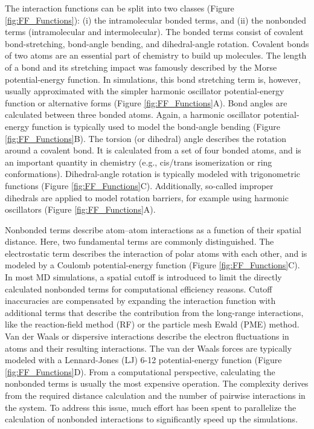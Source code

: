 The interaction functions can be split into two classes (Figure \ref{fig:FF_Functions}): (i) the intramolecular bonded terms, and (ii) the nonbonded terms (intramolecular and intermolecular).\cite{Weiner1984, Riniker2018}
The bonded terms consist of covalent bond-stretching, bond-angle bending, and dihedral-angle rotation.
Covalent bonds of two atoms are an essential part of chemistry to build up molecules. \cite{Pauling1934} The length of a bond and its stretching impact was famously described by the Morse potential-energy function. \cite{Morse1929, Iozzi2009} In simulations, this bond stretching term is, however, usually approximated with the simpler harmonic oscillator potential-energy function or alternative forms (Figure \ref{fig:FF_Functions}A).\cite{Gunsteren1996} Bond angles are calculated between three bonded atoms. \cite{Pauling1931, Slater1931}
Again, a harmonic oscillator potential-energy function is typically used to model the bond-angle bending (Figure \ref{fig:FF_Functions}B). 
The torsion (or dihedral) angle describes the rotation around a covalent bond. \cite{Blondel1996} It is calculated from a set of four bonded atoms, and is an important quantity in chemistry (e.g., cis/trans isomerization \cite{Dugave2003} or ring conformations\cite{Strauss1970}). Dihedral-angle rotation is typically modeled with trigonometric functions (Figure \ref{fig:FF_Functions}C).
Additionally, so-called improper dihedrals are applied to model rotation barriers, for example using harmonic oscillators (Figure \ref{fig:FF_Functions}A).\cite{Blondel1996}

Nonbonded terms describe atom--atom interactions as a function of their spatial distance. Here, two fundamental terms are commonly distinguished.
The electrostatic term describes the interaction of polar atoms with each other, and is modeled by a Coulomb potential-energy function (Figure \ref{fig:FF_Functions}C). \cite{Gillmor2017, Atkins2014} In most MD simulations, a spatial cutoff is introduced to limit the directly calculated nonbonded terms for computational efficiency reasons. Cutoff inaccuracies are compensated by expanding the interaction function with additional terms that describe the contribution from the long-range interactions, like the reaction-field method (RF) \cite{Tironi1995} or the particle mesh Ewald (PME) \cite{Darden1993} method.
Van der Waals or dispersive interactions describe the electron fluctuations in atoms and their resulting interactions.\cite{Kawai2016, Margenau1939} The van der Waals forces \cite{Margenau1939} are typically modeled with a Lennard-Jones (LJ)\cite{Jones1924} 6-12 potential-energy function (Figure \ref{fig:FF_Functions}D).
From a computational perspective, calculating the nonbonded terms is usually the most expensive operation. The complexity derives from the required distance calculation and the number of pairwise interactions in the system. To address this issue, much effort has been spent to parallelize the calculation of nonbonded interactions to significantly speed up the simulations.\cite{Berendsen1995, Schmid2012, Eastman2010, Meel2008}

